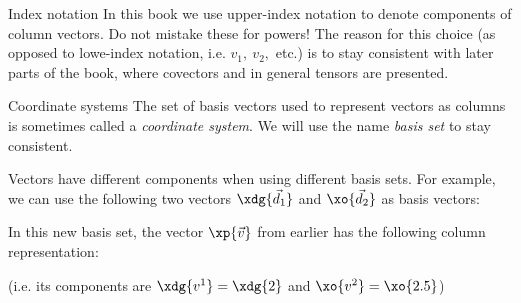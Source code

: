 \begin{note}{Index notation}{}
  In this book we use upper-index notation to denote components of column vectors. Do not mistake these for powers! The reason for this choice (as opposed to lowe-index notation, i.e. $v_{1},\ v_{2},$ etc.) is to stay consistent with later parts of the book, where covectors and in general tensors are presented.
\end{note}

\begin{note}{Coordinate systems}{}
  The set of basis vectors used to represent vectors as columns is sometimes called a \emph{coordinate system}. We will use the name \emph{basis set} to stay consistent.
\end{note}

Vectors have different components when using different basis sets. For example, we can use the following two vectors $\xdg{\vec{d}_{1}}$ and $\xo{\vec{d}_{2}}$ as basis vectors:

\begin{center}
\end{center}

In this new basis set, the vector $\xp{\vec{v}}$ from earlier has the following column representation:

\vspace{-1.2em}
\begin{center}
\end{center}
(i.e. its components are $\xdg{v^{1}}=\xdg{2}$ and $\xo{v^{2}}=\xo{2.5}$)

